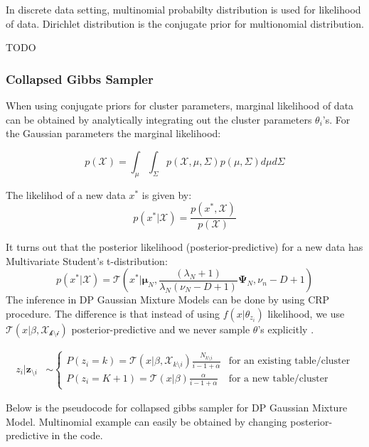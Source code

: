 \documentclass[a4paper]{article}
\begin{document}
In discrete data setting, multinomial probabilty distribution is used
for likelihood of data. Dirichlet distribution is the conjugate prior
for multionomial distribution.

TODO


\subsubsection{Collapsed Gibbs Sampler}

When using conjugate priors for cluster parameters, marginal likelihood
of data can be obtained by analytically integrating out the cluster
parameters \(\theta_i\)'s. For the Gaussian parameters the marginal
likelihood:

\begin{equation*}
p(\mathcal{X}) = \int_\mu\int_\Sigma p(\mathcal{X},\mu,\Sigma)p(\mu,\Sigma)d\mu d\Sigma
\end{equation*}

The likelihod of a new data \(x^*\) is given by:
\begin{equation*}
p(x^* | \mathcal{X}) = \frac{p(x^*,\mathcal{X})}{p(\mathcal{X})}
\end{equation*}

It turns out that the posterior likelihood (posterior-predictive) for a
new data has Multivariate Student's t-distribution\cite{kamper2013gibbs}:
\begin{equation*}
    p(x^*|\mathcal{X}) = \mathcal{T}(x^*|\boldsymbol \mu_N,\frac{(\lambda_N+1)}{\lambda_N(\nu_N-D+1)} \boldsymbol\Psi_N,\nu_n-D+1)
\end{equation*}
The inference in DP Gaussian Mixture Models can be done by using CRP
procedure. The difference is that instead of using \(f(x|\theta_{z_i})\)
likelihood, we use \(\mathcal{T}(x|\beta,\mathcal{X_{k \setminus i}})\)
posterior-predictive and we never sample \(\theta\)'s
explicitly \cite{kamper2013gibbs}.

\begin{align*}
z_i|\boldsymbol z_{\setminus i}  &\sim \begin{cases}
P(z_i=k)=\mathcal{T}(x|\beta,\mathcal{X}_{k \setminus i})\frac{N_{k\setminus i}}{i-1+\alpha} & \text{for an existing table/cluster} \\
P(z_i=K+1)=\mathcal{T}(x|\beta)\frac{\alpha}{i-1+\alpha} & \text{for a new table/cluster}
\end{cases}
\end{align*}

Below is the pseudocode\cite{kamper2013gibbs} for collapsed gibbs sampler for DP
Gaussian Mixture Model. Multinomial example can easily be obtained by
changing posterior-predictive in the code.
\end{document}
